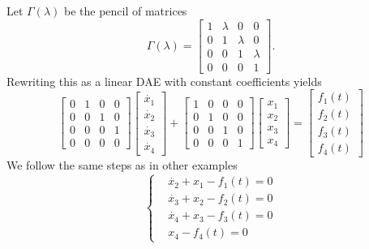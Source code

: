 \pagebreak
\begin{example}
    Let \(\Gamma(\lambda)\) be the pencil of matrices
    \[
        \Gamma(\lambda) =
        \begin{bmatrix}
            1 & \lambda & 0 & 0 \\
            0 & 1 & \lambda & 0 \\
            0 & 0 & 1 & \lambda \\
            0 & 0 & 0 & 1
        \end{bmatrix}.
    \]
    Rewriting this as a linear DAE with constant coefficients yields
    \[
        \begin{bmatrix}
            0 & 1 & 0 & 0 \\
            0 & 0 & 1 & 0 \\
            0 & 0 & 0 & 1 \\
            0 & 0 & 0 & 0
        \end{bmatrix}
        \begin{bmatrix}
            \dot{x_{1}} \\
            \dot{x_{2}} \\
            \dot{x_{3}} \\
            \dot{x_{4}}
        \end{bmatrix} +
        \begin{bmatrix}
            1 & 0 & 0 & 0 \\
            0 & 1 & 0 & 0 \\
            0 & 0 & 1 & 0 \\
            0 & 0 & 0 & 1
        \end{bmatrix}
        \begin{bmatrix}
            x_{1} \\
            x_{2} \\
            x_{3} \\
            x_{4}
        \end{bmatrix}
        =
        \begin{bmatrix}
            f_{1}(t) \\
            f_{2}(t) \\
            f_{3}(t) \\
            f_{4}(t)
        \end{bmatrix}
    \]
    We follow the same steps as in other examples
    \begin{equation*}
        \left\{
            \begin{aligned}
                & \dot{x_{2}} + x_{1} - f_{1}(t) = 0 \\
                & \dot{x_{3}} + x_{2} - f_{2}(t) = 0 \\
                & \dot{x_{4}} + x_{3} - f_{3}(t) = 0 \\
                & x_{4} - f_{4}(t) = 0
            \end{aligned}
        \right.
    \end{equation*}


\end{example}
